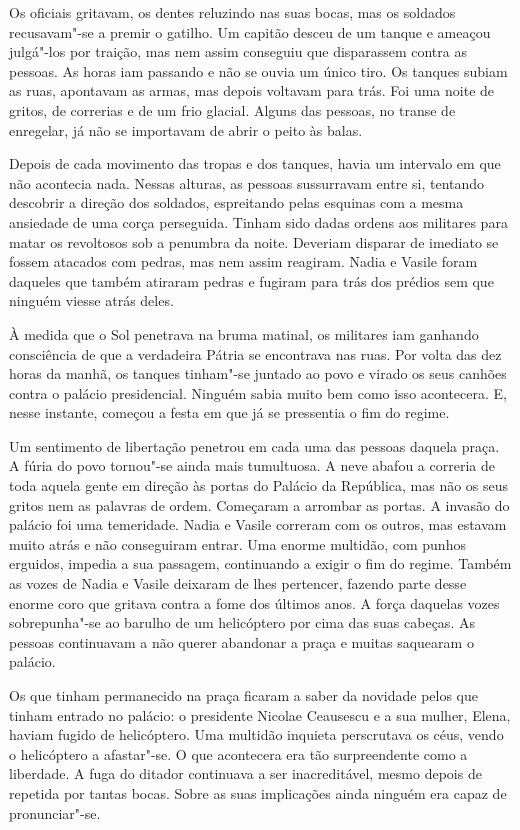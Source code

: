 Os oficiais gritavam, os dentes reluzindo nas suas bocas, mas os
soldados recusavam"-se a premir o gatilho. Um capitão desceu de um tanque
e ameaçou julgá"-los por traição, mas nem assim conseguiu que disparassem
contra as pessoas. As horas iam passando e não se ouvia um único tiro.
Os tanques subiam as ruas, apontavam as armas, mas depois voltavam para
trás. Foi uma noite de gritos, de correrias e de um frio glacial. Alguns
das pessoas, no transe de enregelar, já não se importavam de abrir o
peito às balas.

Depois de cada movimento das tropas e dos tanques, havia um intervalo em
que não acontecia nada. Nessas alturas, as pessoas sussurravam entre si,
tentando descobrir a direção dos soldados, espreitando pelas esquinas
com a mesma ansiedade de uma corça perseguida. Tinham sido dadas ordens
aos militares para matar os revoltosos sob a penumbra da noite. Deveriam
disparar de imediato
se fossem atacados com pedras, mas nem assim reagiram. Nadia e Vasile
foram daqueles que também atiraram pedras e fugiram para trás dos
prédios sem que ninguém viesse atrás deles.

À medida que o Sol penetrava na bruma matinal, os militares iam ganhando
consciência de que a verdadeira Pátria se encontrava nas ruas. Por volta
das dez horas da manhã, os tanques tinham"-se juntado ao povo e virado os
seus canhões contra o palácio presidencial. Ninguém sabia muito bem como
isso acontecera. E, nesse instante, começou a festa em que já se
pressentia o fim do regime.

Um sentimento de libertação penetrou em cada uma das pessoas daquela
praça. A fúria do povo tornou"-se ainda mais tumultuosa. A neve abafou a
correria de toda aquela gente em direção às portas do Palácio da
República, mas não os seus gritos nem as palavras de ordem. Começaram a
arrombar as portas. A invasão do palácio foi uma temeridade. Nadia e
Vasile correram com os outros, mas estavam muito atrás e não
conseguiram entrar. Uma enorme multidão, com punhos erguidos, impedia a
sua passagem, continuando a exigir o fim do regime. Também as vozes de
Nadia e Vasile deixaram de lhes pertencer, fazendo parte desse enorme
coro que gritava contra a fome dos últimos anos. A força daquelas vozes
sobrepunha"-se ao barulho de um helicóptero por cima das suas cabeças. As
pessoas continuavam a não querer abandonar a praça e muitas saquearam o
palácio.

\bigskip

Os que tinham permanecido na praça ficaram a saber da novidade pelos que
tinham entrado no palácio: o presidente Nicolae Ceausescu e a sua mulher, Elena, haviam fugido de
helicóptero. Uma multidão inquieta perscrutava os céus, vendo o
helicóptero a afastar"-se. O que acontecera era tão surpreendente como a
liberdade. A fuga do ditador continuava a ser inacreditável, mesmo
depois de repetida por tantas bocas. Sobre as suas implicações ainda
ninguém era capaz de pronunciar"-se.

